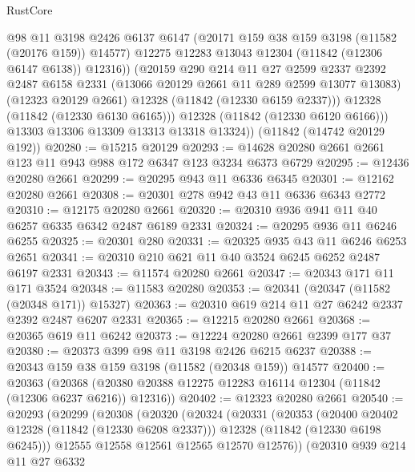 \begin{lexlean}{RustCore}
\begin{coremodule}
                @98
                @11
                @3198
                @2426
                @6137
                @6147
                (@20171 @159 @38 @159 @3198 (@11582 (@20176 @159)) @14577)
                @12275
                @12283
                @13043
                @12304
                (@11842 (@12306 @6147 @6138))
                @12316))
            (@20159
              @290
              @214
              @11
              @27
              @2599
              @2337
              @2392
              @2487
              @6158
              @2331
              (@13066 @20129 @2661 @11 @289 @2599 @13077 @13083)
              (@12323 @20129 @2661)
              @12328
              (@11842 (@12330 @6159 @2337)))
            @12328
            (@11842 (@12330 @6130 @6165)))
          @12328
          (@11842 (@12330 @6120 @6166)))
        @13303
        @13306
        @13309
        @13313
        @13318
        @13324))
    (@11842 (@14742 @20129 @192))
@20280 := @15215 @20129
@20293 := @14628 @20280 @2661 @2661 @123 @11 @943 @988 @172 @6347 @123 @3234 @6373 @6729
@20295 := @12436 @20280 @2661
@20299 := @20295 @943 @11 @6336 @6345
@20301 := @12162 @20280 @2661
@20308 := @20301 @278 @942 @43 @11 @6336 @6343 @2772
@20310 := @12175 @20280 @2661
@20320 := @20310 @936 @941 @11 @40 @6257 @6335 @6342 @2487 @6189 @2331
@20324 := @20295 @936 @11 @6246 @6255
@20325 := @20301 @280
@20331 := @20325 @935 @43 @11 @6246 @6253 @2651
@20341 := @20310 @210 @621 @11 @40 @3524 @6245 @6252 @2487 @6197 @2331
@20343 := @11574 @20280 @2661
@20347 := @20343 @171 @11 @171 @3524
@20348 := @11583 @20280
@20353 := @20341 (@20347 (@11582 (@20348 @171)) @15327)
@20363 := @20310 @619 @214 @11 @27 @6242 @2337 @2392 @2487 @6207 @2331
@20365 := @12215 @20280 @2661
@20368 := @20365 @619 @11 @6242
@20373 := @12224 @20280 @2661 @2399 @177 @37
@20380 := @20373 @399 @98 @11 @3198 @2426 @6215 @6237
@20388 := @20343 @159 @38 @159 @3198 (@11582 (@20348 @159)) @14577
@20400 := @20363
    (@20368 (@20380 @20388 @12275 @12283 @16114 @12304 (@11842 (@12306 @6237 @6216)) @12316))
@20402 := @12323 @20280 @2661
@20540 := @20293
    (@20299
      (@20308
        (@20320
          (@20324
            (@20331
              (@20353
                (@20400 @20402 @12328 (@11842 (@12330 @6208 @2337)))
                @12328
                (@11842 (@12330 @6198 @6245)))
              @12555
              @12558
              @12561
              @12565
              @12570
              @12576))
          (@20310
            @939
            @214
            @11
            @27
            @6332

\end{coremodule}
\end{lexlean}
